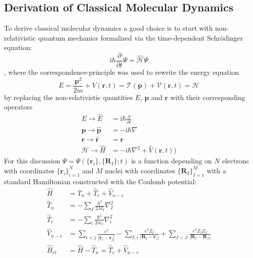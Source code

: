 \documentclass[12pt]{scrartcl}
\begin{document}
\subsection{Derivation of Classical Molecular Dynamics}
\label{sec:cmd}
To derive classical molecular dynamics a good choice is to start with non-relativistic quantum mechanics formalized via the time-dependent Schr\"odinger equation:
\begin{equation}
\mathrm{i} \hbar \frac{\partial }{\partial t} \Psi = \hat{\mathcal{H}} \Psi
\label{eq:tdse}
\end{equation}
, where the correspondence-principle was used to rewrite the energy equation
\begin{equation}
E=\frac{\mathbf{p}^2}{2m}+V(\mathbf{r},t)=\mathcal{T}(\mathbf{p})+\mathcal{V}(\mathbf{r},t)=\mathcal{H}
\end{equation} 
by replacing the non-relativistic quantities $E$, $\mathbf{p}$ and $\mathbf{r}$ with their corresponding operators
\begin{align*}
E \rightarrow \hat{E} &=\mathrm{i}\hbar \frac{\partial }{\partial t}\\
\mathbf{p} \rightarrow \hat{\mathbf{p}} &=-\mathrm{i}\hbar \nabla\\
\mathbf{r} \rightarrow \hat{\mathbf{r}}  &= \mathbf{r}\\
\mathcal{H} \rightarrow \hat{H} &=-\mathrm{i}\hbar \nabla^2 + \hat{V}(\mathbf{r},t))
\end{align*}
For this discussion $\Psi=\Psi(\{\mathbf{r}_i\},\{\mathbf{R}_I \};t)$ is a function depending on $N$ electrons with coordinates $\{\mathbf{r}_i\}_{i=1}^{N}$ and $M$ nuclei with coordinates $\{\mathbf{R}_I\}_{I=1}^{M}$ with a standard Hamiltonian constructed with the Coulomb potential:
\begin{align}
\hat{H} &=\hat{T}_n + \hat{T}_e + \hat{V}_{n-e}\label{def:hamiltonian}\\
\hat{T}_n &=-\sum_{I}\frac{\hbar^2}{2M_I} \nabla^2_I\label{def:nuclearkinetic}\\
\hat{T}_e &=-\sum_{i}\frac{\hbar^2}{2m_e} \nabla^2_i\label{def:electronickinetic}\\
\hat{V}_{n-e}&=\sum_{i<j}\frac{e^2}{|\mathbf{r}_i-\mathbf{r}_j|} - \sum_{I,i}\frac{e^2Z_I}{|\mathbf{R}_I-\mathbf{r}_i|} + \sum_{I<J}\frac{e^2Z_IZ_J}{|\mathbf{R}_I-\mathbf{R}_J|}\label{def:coulomboperator}\\
\hat{H}_{el}&=\hat{H}-\hat{T}_n=\hat{T}_e + \hat{V}_{n-e}\label{def:electronichamilton}
\end{align}
\end{document}
